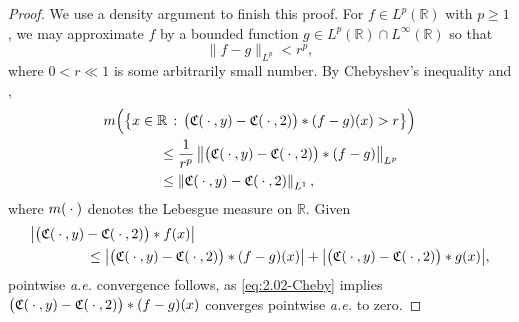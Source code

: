 \documentclass[../dissertation.tex]{subfiles}
\begin{document}
\begin{proof}
	We use a density argument to finish this proof. For $f \in L^p(\mathbb R)$ with 
	$p\geq 1$, we may approximate $f$ 
	by a bounded function $g \in L^p(\mathbb R) \cap L^\infty(\mathbb R)$ so 
	that 
	\[
		\| f - g \|_{L^p} < r^p,
	\]
	where $0 < r \ll 1$ is some arbitrarily small number. By Chebyshev's
	inequality and \cite[Theorem 1.2.10]{Grafakos}, 
	\begin{align}\label{eq:2.02-Cheby}
		&m\Big( 
			\big\{ 
				x \in \mathbb R 
				\,:\, 
				\big(\mathfrak C(\kern 0.5ex \cdot \kern 0.5ex, y) - \mathfrak C(\kern 0.5ex \cdot \kern 0.5ex, 2)\big)*(f-g)(x) > r  
			\big\}  
		\Big) \\
		&\qquad\qquad\leq 
			\frac{1}{r^p} 
			\left\|\big(\mathfrak C(\kern 0.5ex \cdot \kern 0.5ex, y)- \mathfrak C(\kern 0.5ex \cdot \kern 0.5ex, 2)\big)*(f-g) \right\|_{L^p}
			\nonumber\\
		&\qquad\qquad\leq 
			\left\|\mathfrak C(\kern 0.5ex \cdot \kern 0.5ex, y)- \mathfrak C(\kern 0.5ex \cdot \kern 0.5ex, 2) \right\|_{L^1},
			\nonumber
	\end{align}
	where $m(\kern 0.5ex \cdot \kern 0.5ex)$\label{sym:lebesguemeasure} denotes the Lebesgue measure on $\mathbb R$.
	Given
	\begin{align*}
		&\big|\big(\mathfrak C(\kern 0.5ex \cdot \kern 0.5ex, y)- \mathfrak C(\kern 0.5ex \cdot \kern 0.5ex, 2)\big)*f(x) \big| \\
			&\qquad\qquad\leq 
				\big|\big(\mathfrak C(\kern 0.5ex \cdot \kern 0.5ex, y)- \mathfrak C(\kern 0.5ex \cdot \kern 0.5ex, 2)\big)*(f-g)(x)\big|
				+\big|\big(\mathfrak C(\kern 0.5ex \cdot \kern 0.5ex, y)- \mathfrak C(\kern 0.5ex \cdot \kern 0.5ex, 2)\big)*g(x) \big|,
	\end{align*}	
	pointwise \textit{a.e.} convergence follows, as \eqref{eq:2.02-Cheby} implies
	$\big(\mathfrak C(\kern 0.5ex \cdot \kern 0.5ex, y)- \mathfrak C(\kern 0.5ex \cdot \kern 0.5ex, 2)\big)*(f-g)(x)$ converges pointwise
	\textit{a.e.} to zero.
\end{proof}
\end{document}
